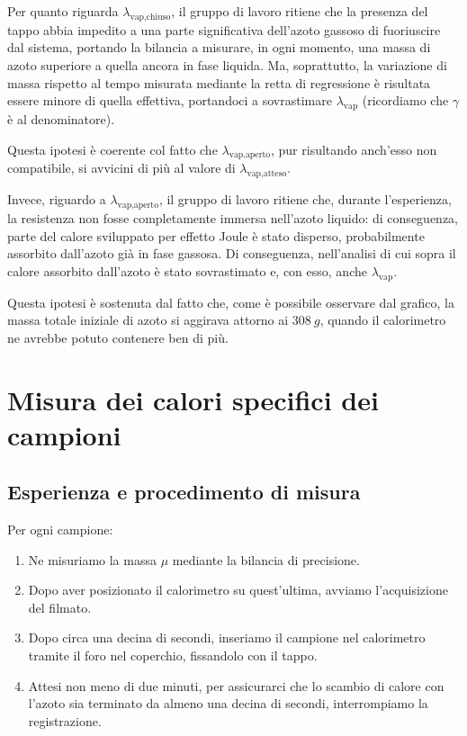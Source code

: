 \documentclass{article}
\begin{document}
\vspace{2mm}
Per quanto riguarda $\lambda_\text{vap,chiuso}$, il gruppo di
lavoro ritiene che la presenza del tappo abbia impedito a una
parte significativa dell'azoto gassoso di fuoriuscire dal sistema,
portando la bilancia a misurare, in ogni momento, una massa di
azoto superiore a quella ancora in fase liquida. Ma, soprattutto,
la variazione di massa rispetto al tempo misurata mediante la
retta di regressione è risultata essere minore di quella effettiva,
portandoci a sovrastimare $\lambda_\text{vap}$ (ricordiamo che
$\gamma$ è al denominatore).

Questa ipotesi è coerente col fatto che $\lambda_\text{vap,aperto}$,
pur risultando anch'esso non compatibile, si avvicini di più al valore
di $\lambda_\text{vap,atteso}$.

\vspace{2mm}
Invece, riguardo a $\lambda_\text{vap,aperto}$, il gruppo di
lavoro ritiene che, durante l'esperienza, la resistenza non fosse
completamente immersa nell'azoto liquido: di conseguenza, parte
del calore sviluppato per effetto Joule è stato disperso,
probabilmente assorbito dall'azoto già in fase gassosa.
Di conseguenza, nell'analisi di cui sopra il calore assorbito
dall'azoto è stato sovrastimato e, con esso, anche
$\lambda_\text{vap}$.

Questa ipotesi è sostenuta dal fatto che, come è possibile
osservare dal grafico, la massa totale iniziale di azoto si
aggirava attorno ai $\qty{308}{g}$, quando il calorimetro ne
avrebbe potuto contenere ben di più.

\section{Misura dei calori specifici dei campioni}

\subsection{Esperienza e procedimento di misura}

Per ogni campione:
\begin{enumerate}
  \item
    Ne misuriamo la massa $\mu$ mediante la bilancia di precisione.
  \item
    Dopo aver posizionato il calorimetro su quest'ultima,
    avviamo l'acquisizione del filmato.
  \item
    Dopo circa una decina di secondi, inseriamo il campione nel
    calorimetro tramite il foro nel coperchio, fissandolo con il tappo.
  \item
    Attesi non meno di due minuti, per assicurarci che lo scambio di calore con
    l'azoto sia terminato da almeno una decina di secondi, interrompiamo
    la registrazione.
\end{enumerate}
\end{document}
